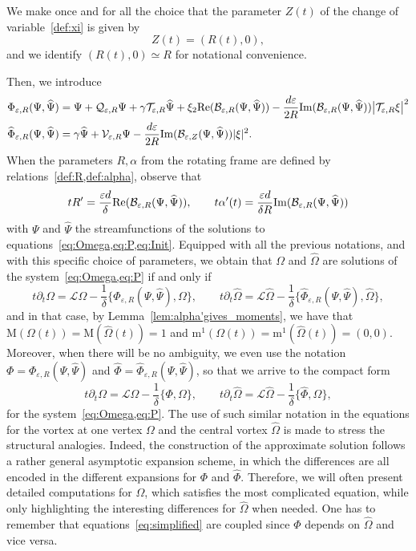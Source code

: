 \documentclass[11pt,reqno,a4paper]{amsart}
\def\eps{\varepsilon}
\def\de{{\partial}}
\def\Re{{\rm Re}}
\def\Im{{\rm Im}}
\newcommand{\cB}{\mathcal{B}}
\newcommand{\cL}{\mathcal{L}}
\newcommand{\cQ}{\mathcal{Q}}
\newcommand{\cT}{\mathcal{T}}
\newcommand{\cV}{\mathcal{V}}
\newcommand{\mrm}{\mathrm{m}}
\newcommand{\mrM}{\mathrm{M}}
\newcommand{\1}{\mathbbm{1}}
\theoremstyle{definition}
\theoremstyle{definition}
\numberwithin{equation}{section}
\begin{document}
We make once and for all the choice that the parameter $Z(t)$ of the change of variable~\cref{def:xi} is given by $$Z(t) = (R(t),0), $$ and we identify $(R(t),0) \simeq R$ for notational convenience. 

Then, we introduce
\begin{align}
    \label{def:Xieps}&\Phi_{\eps,R}(\Psi,\widehat{\Psi}) =\Psi+\cQ_{\eps,R}\Psi+\gamma\cT_{\eps,R} \widehat{\Psi}+\xi_2\Re(\cB_{\eps,R}(\Psi,\widehat{\Psi}))-\frac{d \eps}{2 R}\Im(\cB_{\eps,R}(\Psi,\widehat{\Psi}))\big|\cT_{\eps,R}\xi\big|^2\\
\label{def:Thetaeps}&\widehat{\Phi}_{\eps,R}(\Psi,\widehat{\Psi}) =\gamma\widehat{\Psi}+\cV_{\eps,R} \Psi-\frac{d \eps}{2 R}\Im(\cB_{\eps,Z}(\Psi,\widehat{\Psi}))|\xi|^2.
\end{align}
When the parameters $R,\alpha$ from the rotating frame are defined by relations~\cref{def:R,def:alpha}, observe that
\begin{equation}
    tR'=\frac{\eps d}{\delta } \Re(\cB_{\eps,R}(\Psi,\widehat{\Psi})), \qquad t \alpha'(t) = \frac{\eps d}{\delta R} \Im(\cB_{\eps,R}(\Psi,\widehat{\Psi}))
\end{equation}
with $\Psi$ and $\widehat{\Psi}$ the streamfunctions of the solutions to equations~\cref{eq:Omega,eq:P,eq:Init}.
Equipped with all the previous notations, and with this specific choice of parameters, we obtain that $\Omega$ and $\widehat{\Omega}$ are solutions of the system~\cref{eq:Omega,eq:P} if and only if
\begin{equation}
\label{eq:OmPhiR}
    t\de_t\Omega=\cL\Omega-\frac{1}{\delta}\Big\{\Phi_{\eps,R}(\Psi,\widehat{\Psi}),\Omega \Big\},\qquad t\de_t\widehat{\Omega}=\cL \widehat{\Omega}-\frac{1}{\delta}\Big\{\widehat{\Phi}_{\eps,R}(\Psi,\widehat{\Psi}),\widehat{\Omega}\Big\},
\end{equation}
and in that case, by Lemma~\ref{lem:alpha'gives_moments}, we have that $\mrM(\Omega(t))=\mrM(\widehat{\Omega}(t))=1$ and  $\mrm^1(\Omega(t))=\mrm^1(\widehat{\Omega}(t))=(0,0)$.
Moreover, when there will be no ambiguity, we even use the notation $\Phi = \Phi_{\eps,R}(\Psi,\widehat{\Psi})$ and $\widehat{\Phi} = \widehat{\Phi}_{\eps,R}(\Psi,\widehat{\Psi})$, so that we arrive to the compact form
\begin{equation}
\label{eq:simplified}
t\de_t\Omega=\cL\Omega-\frac{1}{\delta}\{\Phi,\Omega\},\qquad t\de_t\widehat{\Omega}=\cL \widehat{\Omega}-\frac{1}{\delta}\{\widehat{\Phi},\widehat{\Omega}\},
\end{equation}
for the system~\cref{eq:Omega,eq:P}. The use of such similar notation in the equations for the vortex at one vertex $\Omega$ and the central vortex $\widehat{\Omega}$ is made to stress the structural analogies. Indeed, the construction of the approximate solution follows a rather general asymptotic expansion scheme, in which the differences are all encoded in the different expansions for $\Phi$ and $\widehat{\Phi}$. 
Therefore, we will often present detailed computations for $\Omega$, which satisfies the most complicated equation, while only highlighting the interesting differences for $\widehat{\Omega}$ when needed. One has to remember that equations~\cref{eq:simplified} are coupled since $\Phi$ depends on $\widehat{\Omega}$ and vice versa.
 
\end{document}
